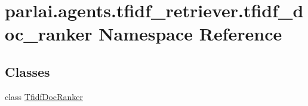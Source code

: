 \hypertarget{namespaceparlai_1_1agents_1_1tfidf__retriever_1_1tfidf__doc__ranker}{}\section{parlai.\+agents.\+tfidf\+\_\+retriever.\+tfidf\+\_\+doc\+\_\+ranker Namespace Reference}
\label{namespaceparlai_1_1agents_1_1tfidf__retriever_1_1tfidf__doc__ranker}
\subsection*{Classes}
\begin{DoxyCompactItemize}
\item 
class \hyperlink{classparlai_1_1agents_1_1tfidf__retriever_1_1tfidf__doc__ranker_1_1TfidfDocRanker}{Tfidf\+Doc\+Ranker}
\end{DoxyCompactItemize}

